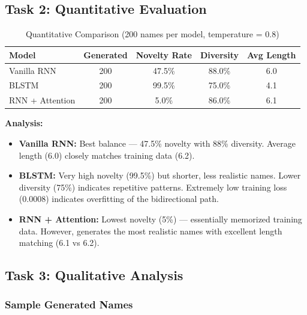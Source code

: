 \documentclass[11pt,a4paper]{article}
\begin{document}
\subsection{Task 2: Quantitative Evaluation}

\begin{table}[H]
\centering
\caption{Quantitative Comparison (200 names per model, temperature = 0.8)}
\vspace{-0.5em}
\begin{tabular}{lcccc}
\toprule
\textbf{Model} & \textbf{Generated} & \textbf{Novelty Rate} & \textbf{Diversity} & \textbf{Avg Length} \\
\midrule
Vanilla RNN & 200 & 47.5\% & 88.0\% & 6.0 \\
BLSTM & 200 & 99.5\% & 75.0\% & 4.1 \\
RNN + Attention & 200 & 5.0\% & 86.0\% & 6.1 \\
\bottomrule
\end{tabular}
\end{table}

\textbf{Analysis:}
\begin{itemize}
    \item \textbf{Vanilla RNN:} Best balance --- 47.5\% novelty with 88\% diversity. Average length (6.0) closely matches training data (6.2).
    \item \textbf{BLSTM:} Very high novelty (99.5\%) but shorter, less realistic names. Lower diversity (75\%) indicates repetitive patterns. Extremely low training loss (0.0008) indicates overfitting of the bidirectional path.
    \item \textbf{RNN + Attention:} Lowest novelty (5\%) --- essentially memorized training data. However, generates the most realistic names with excellent length matching (6.1 vs 6.2).
\end{itemize}

\subsection{Task 3: Qualitative Analysis}

\subsubsection{Sample Generated Names}
\end{document}
